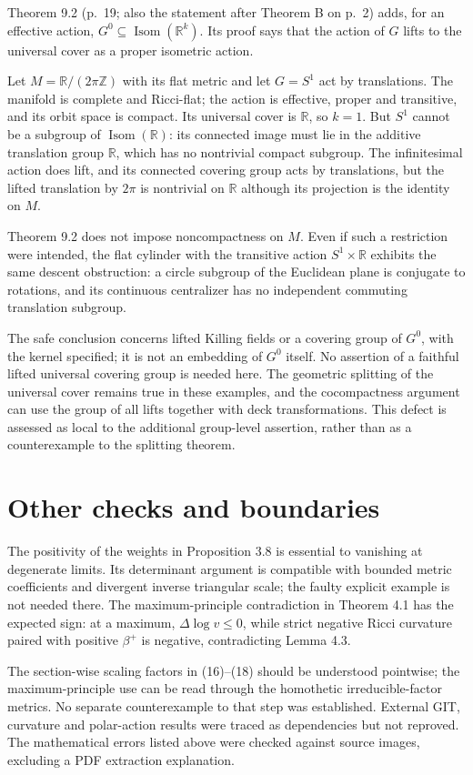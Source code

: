 \documentclass[10pt]{article}
\begin{document}
Theorem 9.2 (p. 19; also the statement after Theorem B on p. 2) adds, for an effective action, \(G^0\subseteq\operatorname{Isom}(\mathbb R^k)\). Its proof says that the action of \(G\) lifts to the universal cover as a proper isometric action.\par
Let \(M=\mathbb R/(2\pi\mathbb Z)\) with its flat metric and let \(G=S^1\) act by translations. The manifold is complete and Ricci-flat; the action is effective, proper and transitive, and its orbit space is compact. Its universal cover is \(\mathbb R\), so \(k=1\). But \(S^1\) cannot be a subgroup of \(\operatorname{Isom}(\mathbb R)\): its connected image must lie in the additive translation group \(\mathbb R\), which has no nontrivial compact subgroup. The infinitesimal action does lift, and its connected covering group acts by translations, but the lifted translation by \(2\pi\) is nontrivial on \(\mathbb R\) although its projection is the identity on \(M\).\par
Theorem 9.2 does not impose noncompactness on \(M\). Even if such a restriction were intended, the flat cylinder with the transitive action \(S^1\times\mathbb R\) exhibits the same descent obstruction: a circle subgroup of the Euclidean plane is conjugate to rotations, and its continuous centralizer has no independent commuting translation subgroup.\par
The safe conclusion concerns lifted Killing fields or a covering group of \(G^0\), with the kernel specified; it is not an embedding of \(G^0\) itself. No assertion of a faithful lifted universal covering group is needed here. The geometric splitting of the universal cover remains true in these examples, and the cocompactness argument can use the group of all lifts together with deck transformations. This defect is assessed as local to the additional group-level assertion, rather than as a counterexample to the splitting theorem.\par
\section*{Other checks and boundaries}
The positivity of the weights in Proposition 3.8 is essential to vanishing at degenerate limits. Its determinant argument is compatible with bounded metric coefficients and divergent inverse triangular scale; the faulty explicit example is not needed there. The maximum-principle contradiction in Theorem 4.1 has the expected sign: at a maximum, \(\Delta\log v\leq0\), while strict negative Ricci curvature paired with positive \(\beta^+\) is negative, contradicting Lemma 4.3.\par
The section-wise scaling factors in (16)–(18) should be understood pointwise; the maximum-principle use can be read through the homothetic irreducible-factor metrics. No separate counterexample to that step was established. External GIT, curvature and polar-action results were traced as dependencies but not reproved. The mathematical errors listed above were checked against source images, excluding a PDF extraction explanation.\par
\end{document}
